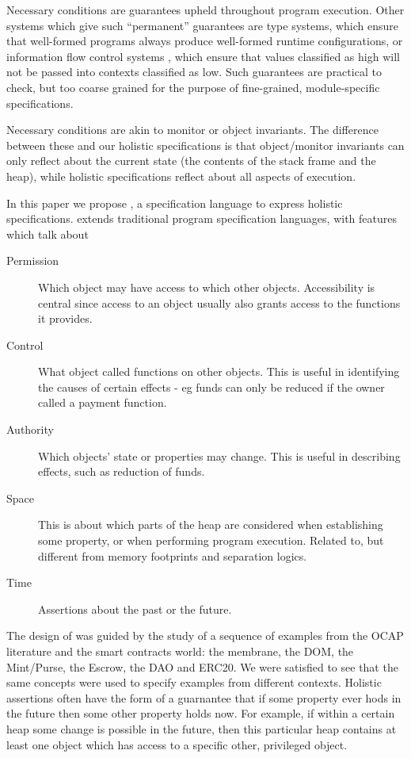 Necessary conditions are guarantees upheld throughout program execution.
Other systems which give such ``permanent'' guarantees are    type systems, 
which ensure that well-formed programs  always produce well-formed runtime
configurations, or information flow control systems \cite{infoflow}, which ensure that values 
classified as high  will not be passed into contexts classified as low. 
Such  guarantees %
 are  practical to check, but   too coarse grained
for the purpose of fine-grained,  module-specific specifications. 

Necessary conditions are  akin to  monitor or object invariants\cite{Hoare74,Meyer97}. The difference between
these and our holistic specifications is that object/monitor invariants can only reflect about 
the current state (\ie the contents of the
stack frame and the heap), while   holistic specifications reflect about all aspects of execution.

In this paper we propose \Chainmail, a specification language to express holistic specifications. \Chainmail extends 
traditional program specification languages\cite{jml,Eiffel}, with features which talk about

\begin{description}
\item[Permission] Which object may have access to which other objects. 
Accessibility is central since access to an object usually also grants access to the functions it provides.

\item[Control] What object called functions on other objects. This is useful in identifying the causes of certain effects - eg 
funds can only be reduced if the owner called a payment function.

\item[Authority]  Which objects' state or properties may change. This is useful in describing effects, such as  reduction of funds.

\item[Space] This is about which parts of the heap are considered when establishing some property, or when 
performing program execution. 
Related to, but different from memory footprints and separation logics.

\item[Time] Assertions about the past or the future.
\end{description}


The design of \Chainmail was guided by the study of a sequence of examples from the OCAP literature and the 
smart contracts world: the membrane, the DOM, the Mint/Purse, the Escrow, the DAO and ERC20. 
We were satisfied to see that the same concepts were used to specify examples from  different contexts.
Holistic assertions often have the form of a guarnantee
 that if some property ever hods in the future then some other property holds now.
For example, if within a certain heap some change is possible in the future, then this particular heap contains 
at least one object which has access to a specific other, privileged object.


